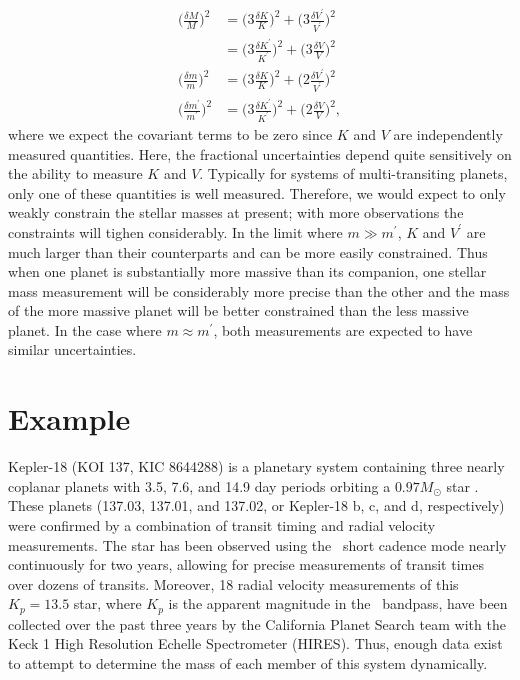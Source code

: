 \begin{align}
\bigg(\frac{\delta M}{M}\bigg)^2 &=  \bigg(3 \frac{ \delta K }{K}\bigg) ^2 +  \bigg(3 \frac{ \delta V^\prime}{V^\prime} \bigg) ^2 \nonumber \\
 &=  \bigg(3\frac{ \delta K^\prime }{K^\prime}\bigg) ^2 +  \bigg(3 \frac{\delta V}{V} \bigg) ^2 \\
\bigg(\frac{\delta m}{m}\bigg)^2 &=  \bigg(3\frac{ \delta K }{K}\bigg) ^2 +  \bigg(2 \frac{\delta V^\prime}{V^\prime} \bigg) ^2 \\
\bigg(\frac{\delta m^\prime}{m^\prime}\bigg)^2 &=  \bigg(3\frac{ \delta K^\prime }{K^\prime}\bigg) ^2 +  \bigg(2 \frac{\delta V}{V} \bigg) ^2,
\end{align}
where we expect the covariant terms to be zero since $K$ and $V$ are independently measured quantities. Here, the fractional uncertainties depend quite sensitively on the ability to measure $K$ and $V$. Typically for systems of multi-transiting planets, only one of these quantities is well measured. Therefore, we would expect to only weakly constrain the stellar masses at present; with more observations the constraints will tighen considerably. In the limit where $m \gg m^\prime$, $K$ and $V^{\prime}$ are much larger than their counterparts and can be more easily constrained. Thus when one planet is substantially more massive than its companion, one stellar mass measurement will be considerably more precise than the other and the mass of the more massive planet will be better constrained than the less massive planet. In the case where $m \approx m^\prime$, both measurements are expected to have similar uncertainties. 

\section{Example}

Kepler-18 (KOI 137, KIC 8644288) is a planetary system containing three nearly coplanar planets with 3.5, 7.6, and 14.9 day periods orbiting a $0.97 M_\odot$ star \citep[henceforth C11]{Cochran11}. These planets (137.03, 137.01, and 137.02, or Kepler-18 b, c, and d, respectively) were confirmed by a combination of transit timing and radial velocity measurements. The star has been observed using the \kep\ short cadence mode nearly continuously for two years, allowing for precise measurements of transit times over dozens of transits. Moreover, 18 radial velocity measurements of this $K_p = 13.5$ star, where $K_p$ is the apparent magnitude in the \kep\ bandpass, have been collected over the past three years by the California Planet Search team with the Keck 1 High Resolution Echelle Spectrometer (HIRES). Thus, enough data exist to attempt to determine the mass of each member of this system dynamically.

